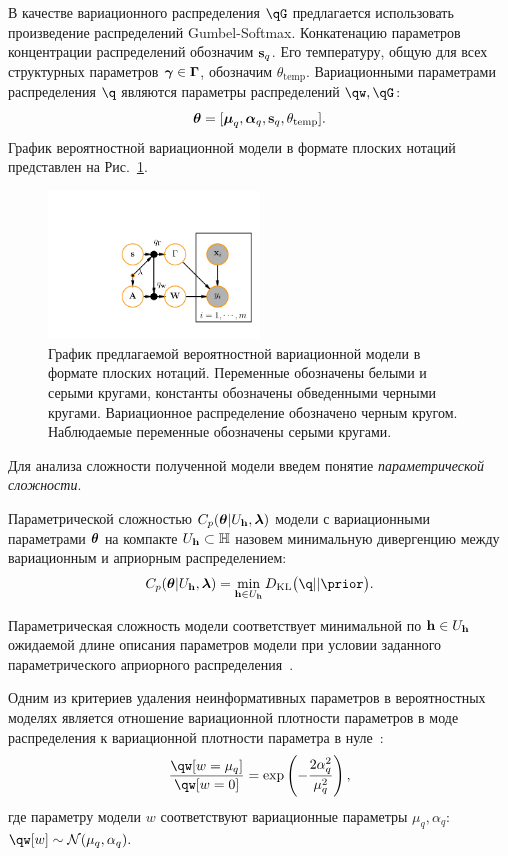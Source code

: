 В качестве вариационного распределения $\qG$ предлагается использовать произведение распределений Gumbel-Softmax. Конкатенацию параметров концентрации распределений обозначим $\mathbf{s}_q$. Его температуру, общую для всех структурных параметров $\boldsymbol{\gamma} \in \boldsymbol{\Gamma}$, обозначим $\theta_\text{temp}$.
Вариационными параметрами распределения $\q$ являются параметры распределений $\qw, \qG$:
\[\boldsymbol{\theta} =[\boldsymbol{\mu}_q, \boldsymbol{\alpha}_q,\mathbf{s}_q, \theta_\text{temp}]. 
\]
График вероятностной вариационной модели в формате плоских нотаций представлен на Рис.~\ref{fig:plate_qprob}.
\begin{figure}
\centering
   \includegraphics[width=0.5\textwidth]{plots/notebooks/plate.pdf}
\caption{График предлагаемой вероятностной вариационной модели в формате плоских нотаций. Переменные обозначены белыми и серыми кругами, константы обозначены обведенными черными кругами. Вариационное распределение обозначено черным кругом. Наблюдаемые переменные обозначены серыми кругами.}
\label{fig:plate_qprob}
\end{figure}
Для анализа сложности полученной модели введем понятие \textit{параметрической сложности}. 
\begin{defin} 
Параметрической сложностью  $C_p(\boldsymbol{\theta}|U_{\mathbf{h}}, \boldsymbol{\lambda})$ модели с вариационными параметрами $\boldsymbol{\theta}$ на компакте $U_{\mathbf{h}} \subset \mathbb{H}$ назовем минимальную дивергенцию между вариационным и априорным распределением:
\[
C_p(\teta|\Uh, \lam) = \min_{\h \in \Uh} \KL{\q}{\prior}.
\]
\end{defin}
Параметрическая сложность модели соответствует минимальной по $\mathbf{h} \in U_{\mathbf{h}}$ ожидаемой длине описания параметров модели при условии заданного параметрического априорного распределения~\cite{hinton_mdl}.

Одним из критериев удаления неинформативных параметров в вероятностных моделях является отношение вариационной плотности параметров в моде распределения к вариационной плотности параметра в нуле~\cite{nips}:
\[\frac{\qw[w=\mu_q]}{\qw[w=0]}= \text{exp}\left(-\frac{2\alpha_q^2}{\mu_q^2}\right),
\]
где параметру модели $w$ соответствуют вариационные параметры $\mu_q, \alpha_q$: $\qw[w] \sim \mathcal{N}(\mu_q, \alpha_q).$

